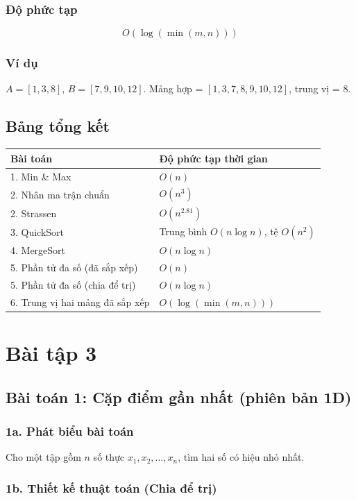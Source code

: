 \documentclass{article}
\begin{document}
\subsubsection{Độ phức tạp}
\[
O(\log(\min(m, n)))
\]

\subsubsection{Ví dụ}
\(A = [1, 3, 8]\), \(B = [7, 9, 10, 12]\). Mảng hợp = \([1,3,7,8,9,10,12]\), trung vị = \(8\).

\subsection{Bảng tổng kết}

\begin{tabular}{|l|l|}
\hline
\textbf{Bài toán} & \textbf{Độ phức tạp thời gian} \\
\hline
1. Min \& Max & \(O(n)\) \\
2. Nhân ma trận chuẩn & \(O(n^3)\) \\
2. Strassen & \(O(n^{2.81})\) \\
3. QuickSort & Trung bình \(O(n\log n)\), tệ \(O(n^2)\) \\
4. MergeSort & \(O(n\log n)\) \\
5. Phần tử đa số (đã sắp xếp) & \(O(n)\) \\
5. Phần tử đa số (chia để trị) & \(O(n\log n)\) \\
6. Trung vị hai mảng đã sắp xếp & \(O(\log(\min(m,n)))\) \\
\hline
\end{tabular}

\section{Bài tập 3}

\subsection{Bài toán 1: Cặp điểm gần nhất (phiên bản 1D)}

\subsubsection{1a. Phát biểu bài toán}

Cho một tập gồm \(n\) số thực \(x_1, x_2, \dots, x_n\), tìm hai số có hiệu nhỏ nhất.

\subsubsection{1b. Thiết kế thuật toán (Chia để trị)}
\end{document}

